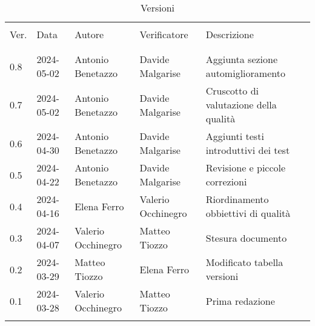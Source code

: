 \documentclass[italian,12pt]{article} %
\begin{document}

\newpage

\captionsetup[table]{list=no}
\begin{table}[!h]
	\caption*{Versioni}
	\footnotesize
	\begin{center}
		\begin{tabular}{ l l l l p{6cm} }
			\hline                                                                                               \\[-2ex]
			Ver. & Data       & Autore             & Verificatore       & Descrizione                            \\
			\\[-2ex] \hline \\[-1.5ex]
			0.8  & 2024-05-02 & Antonio Benetazzo  & Davide Malgarise   & Aggiunta sezione automiglioramento     \\
			0.7  & 2024-05-02 & Antonio Benetazzo  & Davide Malgarise   & Cruscotto di valutazione della qualità \\
			0.6  & 2024-04-30 & Antonio Benetazzo  & Davide Malgarise   & Aggiunti testi introduttivi dei test   \\
			0.5  & 2024-04-22 & Antonio Benetazzo  & Davide Malgarise   & Revisione e piccole correzioni         \\
			0.4  & 2024-04-16 & Elena Ferro        & Valerio Occhinegro & Riordinamento obbiettivi di qualità    \\
			0.3  & 2024-04-07 & Valerio Occhinegro & Matteo Tiozzo      & Stesura documento                      \\
			0.2  & 2024-03-29 & Matteo Tiozzo      & Elena Ferro        & Modificato tabella versioni            \\
			0.1  & 2024-03-28 & Valerio Occhinegro & Matteo Tiozzo      & Prima redazione                        \\
			\\[-1.5ex] \hline
		\end{tabular}
	\end{center}
\end{table}
\captionsetup[table]{list=yes}
\newpage
\tableofcontents
\listoftables
\listoffigures
\newpage





\end{document}
